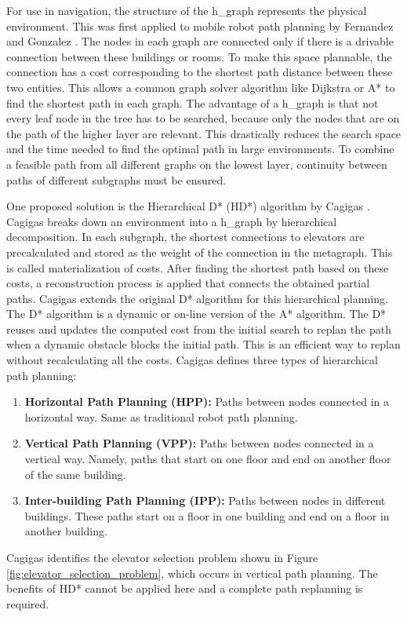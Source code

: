 For use in navigation, the structure of the \gls{h_graph} represents the physical environment. This was first applied to mobile robot path planning by Fernandez and Gonzalez \cite{fernandez_hierarchical_1998} \cite{fernandez-madrigal_multi-hierarchical_2001}. The nodes in each graph are connected only if there is a drivable connection between these buildings or rooms. To make this space plannable, the connection has a cost corresponding to the shortest path distance between these two entities. This allows a common graph solver algorithm like Dijkstra or A* to find the shortest path in each graph. The advantage of a \gls{h_graph} is that not every leaf node in the tree has to be searched, because only the nodes that are on the path of the higher layer are relevant. This drastically reduces the search space and the time needed to find the optimal path in large environments. To combine a feasible path from all different graphs on the lowest layer, continuity between paths of different subgraphs must be ensured.

One proposed solution is the Hierarchical D* (HD*) algorithm by Cagigas \cite{cagigas_hierarchical_2005}. Cagigas breaks down an environment into a \gls{h_graph} by hierarchical decomposition. In each subgraph, the shortest connections to elevators are precalculated and stored as the weight of the connection in the metagraph. This is called materialization of costs. After finding the shortest path based on these costs, a reconstruction process is applied that connects the obtained partial paths. Cagigas extends the original D* algorithm \cite{hebert_optimal_1997} for this hierarchical planning. The D* algorithm is a dynamic or on-line version of the A* algorithm. The D* reuses and updates the computed cost from the initial search to replan the path when a dynamic obstacle blocks the initial path. This is an efficient way to replan without recalculating all the costs. Cagigas defines three types of hierarchical path planning: 
\begin{enumerate}
    \item \textbf{Horizontal Path Planning (HPP):} Paths between nodes connected in a horizontal way. Same as traditional robot path planning.
    \item \textbf{Vertical Path Planning (VPP):} Paths between nodes connected in a vertical way. Namely, paths that start on one floor and end on another floor of the same building.
    \item \textbf{Inter-building Path Planning (IPP):} Paths between nodes in different buildings. These paths start on a floor in one building and end on a floor in another building.
\end{enumerate}
Cagigas identifies the elevator selection problem shown in Figure \ref{fig:elevator_selection_problem}, which occurs in vertical path planning. The benefits of HD* cannot be applied here and a complete path replanning is required.

